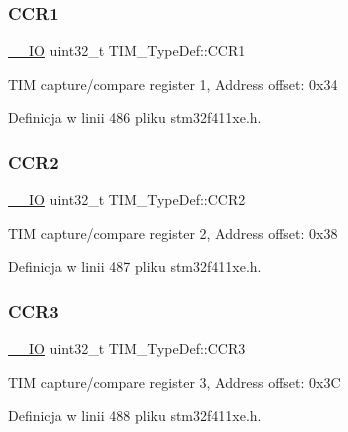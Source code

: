 \subsubsection{\texorpdfstring{C\+C\+R1}{CCR1}}
{\footnotesize\ttfamily \hyperlink{core__sc300_8h_aec43007d9998a0a0e01faede4133d6be}{\+\_\+\+\_\+\+IO} uint32\+\_\+t T\+I\+M\+\_\+\+Type\+Def\+::\+C\+C\+R1}

T\+IM capture/compare register 1, Address offset\+: 0x34 

Definicja w linii 486 pliku stm32f411xe.\+h.

\mbox{\label{struct_t_i_m___type_def_a4d1171e9a61538424b8ef1f2571986d0}} 
\subsubsection{\texorpdfstring{C\+C\+R2}{CCR2}}
{\footnotesize\ttfamily \hyperlink{core__sc300_8h_aec43007d9998a0a0e01faede4133d6be}{\+\_\+\+\_\+\+IO} uint32\+\_\+t T\+I\+M\+\_\+\+Type\+Def\+::\+C\+C\+R2}

T\+IM capture/compare register 2, Address offset\+: 0x38 

Definicja w linii 487 pliku stm32f411xe.\+h.

\mbox{\label{struct_t_i_m___type_def_ac83441bfb8d0287080dcbd945a272a74}} 
\subsubsection{\texorpdfstring{C\+C\+R3}{CCR3}}
{\footnotesize\ttfamily \hyperlink{core__sc300_8h_aec43007d9998a0a0e01faede4133d6be}{\+\_\+\+\_\+\+IO} uint32\+\_\+t T\+I\+M\+\_\+\+Type\+Def\+::\+C\+C\+R3}

T\+IM capture/compare register 3, Address offset\+: 0x3C 

Definicja w linii 488 pliku stm32f411xe.\+h.

\mbox{\label{struct_t_i_m___type_def_a5ba381c3f312fdf5e0b4119641b3b0aa}} 
